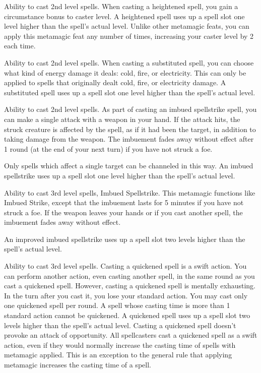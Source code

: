  Ability to cast 2nd level spells.
 When casting a heightened spell, you gain a  circumstance bonus to caster level. A heightened spell uses up a spell slot one level higher than the spell's actual level. Unlike other metamagic feats, you can apply this metamagic feat any number of times, increasing your caster level by 2 each time.

 Ability to cast 2nd level spells.
 When casting a substituted spell, you can choose what kind of energy damage it deals: cold, fire, or electricity. This can only be applied to spells that originally dealt cold, fire, or electricity damage. A substituted spell uses up a spell slot one level higher than the spell's actual level.

 Ability to cast 2nd level spells.
 As part of casting an imbued spellstrike spell, you can make a single attack with a weapon in your hand. If the attack hits, the struck creature is affected by the spell, as if it had been the target, in addition to taking damage from the weapon. The imbuement fades away without effect after 1 round (at the end of your next turn) if you have not struck a foe.

Only spells which affect a single target can be channeled in this way. An imbued spellstrike uses up a spell slot one level higher than the spell's actual level.

 Ability to cast 3rd level spells, Imbued Spellstrike.
 This metamagic functions like Imbued Strike, except that the imbuement lasts for 5 minutes if you have not struck a foe. If the weapon leaves your hands or if you cast another spell, the imbuement fades away without effect.

An improved imbued spellstrike uses up a spell slot two levels higher than the spell's actual level.

\label{Quicken Spell}
 Ability to cast 3rd level spells.
 Casting a quickened spell is a swift action. You can perform another action, even casting another spell, in the same round as you cast a quickened spell. However, casting a quickened spell is mentally exhausting. In the turn after you cast it, you lose your standard action. You may cast only one quickened spell per round. A spell whose casting time is more than 1 standard action cannot be quickened. A quickened spell uses up a spell slot two levels higher than the spell's actual level. Casting a quickened spell doesn't provoke an attack of opportunity.
 All spellcasters cast a quickened spell as a swift action, even if they would normally increase the casting time of spells with metamagic applied. This is an exception to the general rule that applying metamagic increases the casting time of a spell.

